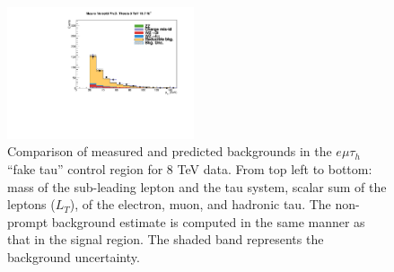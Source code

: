 \begin{figure}
\begin{center}
  \includegraphics[width=0.49\textwidth]{4_Analisys/pics/8TeV/plots/emt/f3/Full/final-f3-tPt-Full.pdf}
  \caption{Comparison of measured and predicted backgrounds in the $e\mu\tau_h$ ``fake tau'' control region for 8 TeV data.
  From top left to bottom: mass of the sub-leading lepton and the tau system, scalar sum of the leptons \pT ($L_T$), \pT of the electron, muon, and hadronic tau.
  The non-prompt background estimate is computed in the same manner as that in the signal region.
  The shaded band represents the background uncertainty.
  }
  \label{fig:LLT_emt_f3_control_8TeV}
\end{center}
\end{figure}


